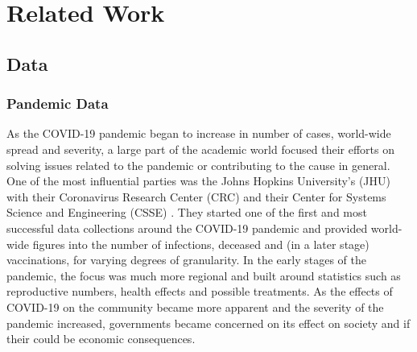 \section{Related Work}
\label{sec:rel}
\subsection{Data}
\subsubsection{Pandemic Data}
As the COVID-19 pandemic began to increase in number of cases, world-wide spread and severity, a large part of the academic world focused their efforts on solving issues related to the pandemic or contributing to the cause in general. One of the most influential parties was the Johns Hopkins University's (JHU) with their Coronavirus Research Center (CRC) and their Center for Systems Science and Engineering (CSSE) \cite{dong2020interactive}. They started one of the first and most successful data collections around the COVID-19 pandemic and provided world-wide figures into the number of infections, deceased and (in a later stage) vaccinations, for varying degrees of granularity. In the early stages of the pandemic, the focus was much more regional \cite{HUANG2020497, wang2020novel, velavan2020covid} and built around statistics such as reproductive numbers, health effects and possible treatments. As the effects of COVID-19 on the community became more apparent and the severity of the pandemic increased, governments became concerned on its effect on society and if their could be economic consequences.
